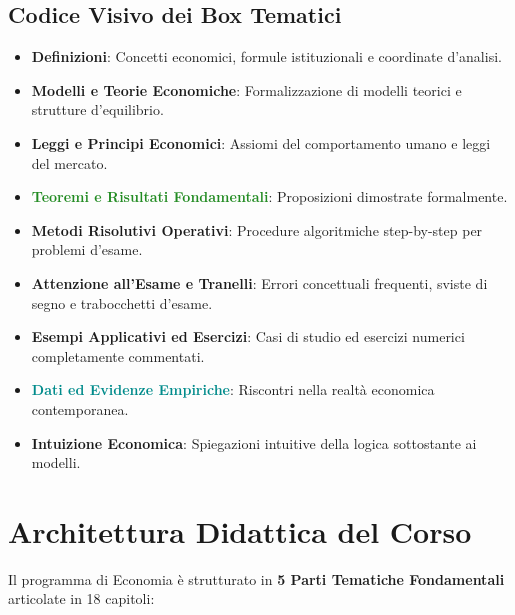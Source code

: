 \documentclass[11pt,a4paper,twoside,openright]{book}
\begin{document}
\section*{Codice Visivo dei Box Tematici}
\begin{itemize}
    \item \textbf{\textcolor{navyblue}{Definizioni}}: Concetti economici, formule istituzionali e coordinate d'analisi.
    \item \textbf{\textcolor{purpleaccent}{Modelli e Teorie Economiche}}: Formalizzazione di modelli teorici e strutture d'equilibrio.
    \item \textbf{\textcolor{tealblue}{Leggi e Principi Economici}}: Assiomi del comportamento umano e leggi del mercato.
    \item \textbf{\textcolor{forestgreen}{Teoremi e Risultati Fondamentali}}: Proposizioni dimostrate formalmente.
    \item \textbf{\textcolor{warmamber}{Metodi Risolutivi Operativi}}: Procedure algoritmiche step-by-step per problemi d'esame.
    \item \textbf{\textcolor{crimsonred}{Attenzione all'Esame e Tranelli}}: Errori concettuali frequenti, sviste di segno e trabocchetti d'esame.
    \item \textbf{\textcolor{purpleaccent}{Esempi Applicativi ed Esercizi}}: Casi di studio ed esercizi numerici completamente commentati.
    \item \textbf{\textcolor{darkcyan}{Dati ed Evidenze Empiriche}}: Riscontri nella realtà economica contemporanea.
    \item \textbf{\textcolor{navyblue!80}{Intuizione Economica}}: Spiegazioni intuitive della logica sottostante ai modelli.
\end{itemize}

\cleardoublepage

\chapter*{Architettura Didattica del Corso}

Il programma di Economia è strutturato in \textbf{5 Parti Tematiche Fondamentali} articolate in 18 capitoli:
\end{document}
